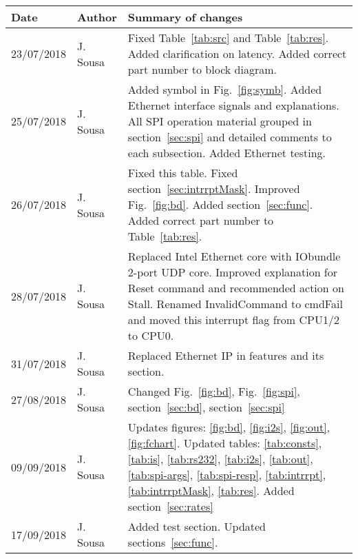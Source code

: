 \documentclass{ug}
\theoremstyle{plain}
\begin{document}
\begin{table}[H]
  \begin{center}
    \begin{tabular}{|l|l|p{8cm}|}
      \hline
      \rowcolor{iob-green}
      \textbf{Date} & \textbf{Author} & \textbf{Summary of changes} \\
      \hline
      \hline
      
     23/07/2018 & J. Sousa & Fixed Table~\ref{tab:src} and
     Table~\ref{tab:res}. Added clarification on latency. Added
     correct part number to block diagram.\\ \hline

     \rowcolor{iob-blue} 25/07/2018 & J.  Sousa & Added symbol in
     Fig.~\ref{fig:symb}. Added Ethernet interface signals and explanations. All
     SPI operation material grouped in section~\ref{sec:spi} and detailed
     comments to each subsection. Added Ethernet testing.\\ \hline

     26/07/2018 & J. Sousa & Fixed this table. Fixed
     section~\ref{sec:intrrptMask}. Improved Fig.~\ref{fig:bd}. Added
     section~\ref{sec:func}. Added correct part number to
     Table~\ref{tab:res}.\\ \hline

     \rowcolor{iob-blue} 28/07/2018 & J. Sousa & Replaced Intel Ethernet core with
     IObundle 2-port UDP core. Improved explanation for Reset command
     and recommended action on Stall. Renamed InvalidCommand to
     cmdFail and moved this interrupt flag from CPU1/2 to
     CPU0.\\ \hline
    
     31/07/2018 & J. Sousa & Replaced Ethernet IP
     in features and its section.\\ \hline

     \rowcolor{iob-blue} 27/08/2018 & J. Sousa & Changed Fig.~\ref{fig:bd},
     Fig.~\ref{fig:spi}, section~\ref{sec:bd}, section~\ref{sec:spi}\\ \hline

     09/09/2018 & J. Sousa & Updates figures: \ref{fig:bd}, \ref{fig:i2s},
     \ref{fig:out}, \ref{fig:fchart}. Updated tables: \ref{tab:consts},
     \ref{tab:is}, \ref{tab:rs232}, \ref{tab:i2s}, \ref{tab:out},
     \ref{tab:spi-args}, \ref{tab:spi-resp}, \ref{tab:intrrpt},
     \ref{tab:intrrptMask}, \ref{tab:res}. Added
     section~\ref{sec:rates}\\ \hline

     \rowcolor{iob-blue} 17/09/2018 & J. Sousa & Added test section. Updated
     sections~\ref{sec:func}.\\ \hline


\end{tabular}
\end{center}
\end{table}
\end{document}
